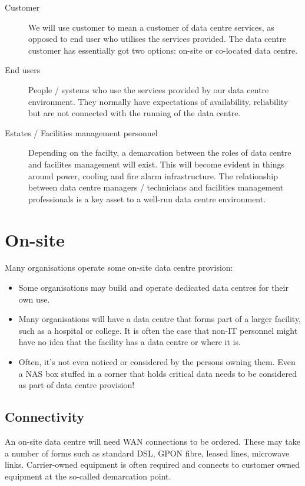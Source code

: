 \documentclass{pgnotes}
\begin{document}
\begin{description}
\item[Customer]
  We will use customer to mean a customer of data centre services, as opposed to end user who utilises the services provided.
  The data centre customer has essentially got two options: on-site or co-located data centre.
\item[End users]
  People / systems who use the services provided by our data centre environment.
  They normally have expectations of availability, reliability but are not connected with the running of the data centre.
\item[Estates / Facilities management personnel]
  Depending on the facilty, a demarcation between the roles of data centre and facilites management will exist.
  This will become evident in things around power, cooling and fire alarm infrastructure.
  The relationship between data centre managers / technicians and facilities management professionals is a key asset to a well-run data centre environment.
\end{description}
  
\section{On-site}

Many organisations operate some on-site data centre provision:
\begin{itemize}
\item
  Some organisations may build and operate dedicated data centres for their own use.
\item
  Many organisations will have a data centre that forms part of a larger facility, such as a hospital or college.
  It is often the case that non-IT personnel might have no idea that the facility has a data centre or where it is.
\item 
  Often, it's not even noticed or considered by the persons owning them.
  Even a NAS box stuffed in a corner that holds critical data needs to be considered as part of data centre provision!
\end{itemize}

\subsection{Connectivity}

An on-site data centre will need WAN connections to be ordered.
These may take a number of forms such as standard DSL, GPON fibre, leased lines, microwave links.
Carrier-owned equipment is often required and connects to customer owned equipment at the so-called demarcation point.
\end{document}
